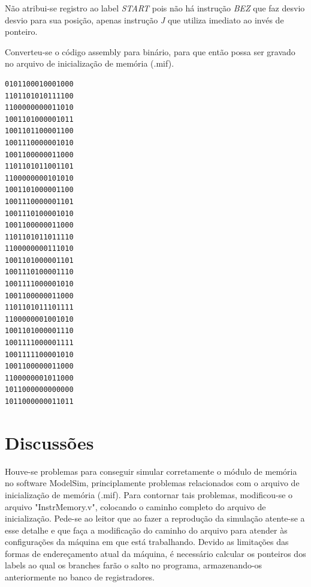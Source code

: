 \documentclass[11pt,a4paper,titlepage]{article}
\begin{document}
Não atribui-se registro ao label \textit{START} pois não há instrução \textit{BEZ} que faz desvio desvio para sua posição, apenas instrução \textit{J} que utiliza imediato ao invés de ponteiro.

Converteu-se o código assembly para binário, para que então possa ser gravado no arquivo de inicialização de memória (.mif).

\begin{lstlisting}
0101100010001000
1101101010111100
1100000000011010
1001101000001011
1001101100001100
1001110000001010
1001100000011000
1101101011001101
1100000000101010
1001101000001100
1001110000001101
1001110100001010
1001100000011000
1101101011011110
1100000000111010
1001101000001101
1001110100001110
1001111000001010
1001100000011000
1101101011101111
1100000001001010
1001101000001110
1001111000001111
1001111100001010
1001100000011000
1100000001011000
1011000000000000
1011000000011011
\end{lstlisting}



\section{Discussões}

Houve-se problemas para conseguir simular corretamente o módulo de memória no software ModelSim, principlamente problemas relacionados com o arquivo de inicialização de memória (.mif). Para contornar tais problemas, modificou-se o arquivo "InstrMemory.v", colocando o caminho completo do arquivo de inicialização. Pede-se ao leitor que ao fazer a reprodução da simulação atente-se a esse detalhe e que faça a modificação do caminho do arquivo para atender às configurações da máquina em que está trabalhando.
Devido as limitações das formas de endereçamento atual da máquina, é necessário calcular os ponteiros dos labels ao qual os branches farão o salto no programa, armazenando-os anteriormente no banco de registradores.



%

\nocite{*}
\end{document}
